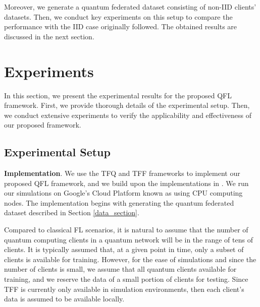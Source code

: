 \documentclass{article}
\begin{document}
Moreover, we generate a quantum federated dataset consisting of non-IID clients' datasets. Then, we conduct key experiments on this setup to compare the performance with the IID case originally followed. The obtained results are discussed in the next section.

\section{Experiments} %
\label{experiments}
In this section, we present the experimental results for the proposed QFL framework. First, we provide thorough details of the experimental setup. Then, we conduct extensive experiments to verify the applicability and effectiveness of our proposed framework. %



\subsection{Experimental Setup}\label{sub_exp_setup}%
\textbf{Implementation}. We use the TFQ and TFF frameworks to implement our proposed QFL framework, and we build upon the implementations in \cite{TFQ_qcnn,FLW}. We run our simulations on Google's Cloud Platform known as  using CPU computing nodes. The implementation begins with generating the quantum federated dataset described in Section \ref{data_section}. 

Compared to classical FL scenarios, it is natural to assume that the number of quantum computing clients in a quantum network will be in the range of tens of clients. It is typically assumed that, at a given point in time, only a subset of clients is available for training. However, for the ease of simulations and since the number of clients is small, we assume that all quantum clients available for training, and we reserve the data of a small portion of clients for testing. Since TFF is currently only available in simulation environments, then each client's data is assumed to be available locally.
\end{document}
